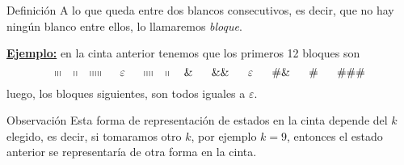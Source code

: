 \begin{frame}
	\begin{block}{Definición}
		\PN A lo que queda entre dos blancos consecutivos, es decir, que no hay ningún blanco entre ellos, lo llamaremos
		\textit{bloque}.
	\end{block}

	\vspace{3mm}
	\PN \underline{\textbf{Ejemplo:}} en la cinta anterior tenemos que los primeros 12 bloques son
	\begin{equation*}
		\shortmid \shortmid \shortmid \ \ \ \shortmid \shortmid \ \ \ \shortmid \shortmid \shortmid \shortmid \shortmid \ \
		\ \ \varepsilon \ \ \ \ \shortmid \shortmid \shortmid \shortmid \ \ \ \shortmid \shortmid \ \ \ \& \ \ \ \ \ \&\& \
		\ \ \ \ \varepsilon \ \ \ \ \ \#\& \ \ \ \ \ \# \ \ \ \ \ \#\#\#
	\end{equation*}
	\PN luego, los bloques siguientes, son todos iguales a $\varepsilon$.

	\begin{alertblock}{Observación}
		\PN Esta forma de representación de estados en la cinta depende del $k$ elegido, es decir, si tomaramos otro $k$,
		por ejemplo $k=9$, entonces el estado anterior se representaría de otra forma en la cinta.
	\end{alertblock}
\end{frame}

